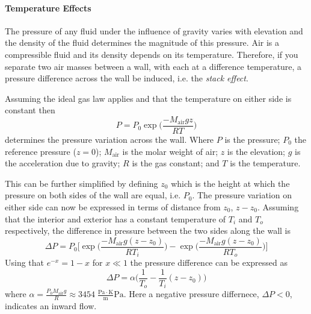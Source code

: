 \paragraph{Temperature Effects}

The pressure of any fluid under the influence of gravity varies with elevation and the density of the fluid determines the magnitude of this pressure.
Air is a compressible fluid and its density depends on its temperature.
Therefore, if you separate two air masses between a wall, with each at a difference temperature, a pressure difference across the wall be induced, i.e. the \textit{stack effect}.

Assuming the ideal gas law applies and that the temperature on either side is constant then
\begin{equation}
  P = P_0 \exp{\Big( \frac{-M_\mathrm{air}gz}{RT} \Big)}
\end{equation}
determines the pressure variation across the wall.
Where $P$ is the pressure; $P_0$ the reference pressure ($z=0$); $M_\mathrm{air}$ is the molar weight of air; $z$ is the elevation; $g$ is the acceleration due to gravity; $R$ is the gas constant; and $T$ is the temperature.\par

This can be further simplified by defining $z_0$ which is the height at which the pressure on both sides of the wall are equal, i.e. $P_0$.
The pressure variation on either side can now be expressed in terms of distance from $z_0$, $z-z_0$.
Assuming that the interior and exterior has a constant temperature of $T_i$ and $T_o$ respectively, the difference in pressure between the two sides along the wall is
\begin{equation}
  \Delta P = P_0 \Big[ \exp{\Big( \frac{-M_\mathrm{air}g(z-z_0)}{RT_i} \Big)} - \exp{\Big( \frac{-M_\mathrm{air}g(z-z_0)}{RT_o} \Big)} \Big]
\end{equation}
Using that $e^{-x} = 1 - x$ for $x \ll 1$ the pressure difference can be expressed as
\begin{equation}
  \Delta P = \alpha \Big( \frac{1}{T_o} - \frac{1}{T_i} (z-z_0)\Big)
\end{equation}
where $\alpha = \frac{P_0 M_\mathrm{air} g}{R} \approx 3454 \; \mathrm{ \frac{Pa \cdot K}{m}Pa}$.
Here a negative pressure differnece, $\Delta P < 0$, indicates an inward flow.\par

